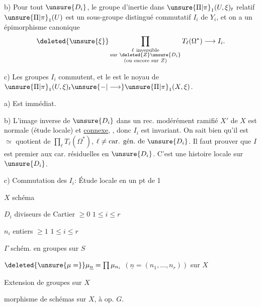 b) Pour tout $\unsure{D_i}$, le groupe d'inertie dans $\unsure{\Pi|\pi}_1(U,\xi)_t$ relatif  $\unsure{\Pi|\pi}_1(U)$ est un sous-groupe distingué  commutatif $I_i$ de $Y_i$,  et on a un épimorphisme canonique
\[
\deleted{\unsure{\xi}}
\prod_{\substack{\ell\ \text{inversible}\\\text{sur }\deleted{Z}\unsure{D_i}\\(\text{ou encore sur }Z)}}T_\ell(\Omega^*)\longrightarrow I_i.
\]

c) Les groupes $I_i$ commutent, et le  est le noyau de $\unsure{\Pi|\pi}_1(U,\xi)_t\unsure{-|\longrightarrow}\unsure{\Pi|\pi}_1(X,\xi)$.

a) Est immédiat.

b) L'image inverse de $\unsure{D_i}$ dans un rec.   modérément ramifié $X'$ de $X$ est normale (étude locale) et \uline{connexe},  , donc $I_i$ est invariant. On sait bien qu'il est $\simeq$ quotient de $\prod_\ell T_\ell(\Omega^*)$, $\ell\ne\text{car. gén.}\text{ de }\unsure{D_i}$. Il faut prouver que $I$ est premier aux car. résiduelles en $\unsure{D_i}$. C'est une histoire locale sur $\unsure{D_i}$.

c) Commutation des $I_i$:  Étude locale en un pt de
\textcircled{1}

$X$ schéma

$D_i$ diviseurs de Cartier $\geq0$ \hfill $1\leq i\leq r$

$n_i$ entiers $\geq1$ \hfill $1\leq i\leq r$

$\Gamma$ schém. en groupes sur $S$

$\deleted{\unsure{\mu=}}\mu_{\underline n}=\prod\mu_{n_i}$ \quad $(\underline n=(n_1,\ldots,n_r))$ sur $X$

Extension de groupes sur $X$

morphisme de schémas sur $X$, à op. $G$.

